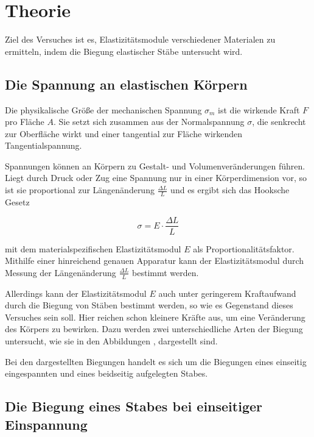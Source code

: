 \section{Theorie}
\label{sec:Theorie}

Ziel des Versuches ist es, Elastizitätsmodule verschiedener Materialen
zu ermitteln, indem die Biegung elastischer Stäbe untersucht wird.

\subsection{Die Spannung an elastischen Körpern}

Die physikalische Größe der mechanischen Spannung $\sigma_m$ ist die wirkende
Kraft $F$ pro Fläche $A$. Sie setzt sich zusammen aus der Normalspannung $\sigma$,
die senkrecht zur Oberfläche wirkt und einer tangential zur Fläche wirkenden
Tangentialspannung.

Spannungen können an Körpern zu Gestalt- und Volumenveränderungen
führen. Liegt durch Druck oder Zug eine Spannung nur in einer Körperdimension vor, 
so ist sie proportional zur Längenänderung $\frac{\Delta L}{L}$ und es ergibt sich
das Hooksche Gesetz

\begin{equation}
    \sigma = E \cdot \frac{\Delta L}{L}
\end{equation}

mit dem materialspezifischen Elastizitätsmodul $E$ als Proportionalitätsfaktor.
Mithilfe einer hinreichend genauen Apparatur kann der Elastizitätsmodul durch
Messung der Längenänderung $\frac{\Delta L}{L}$ bestimmt werden.

Allerdings kann der Elastizitätsmodul $E$ auch unter geringerem Kraftaufwand
durch die Biegung von Stäben bestimmt werden, so wie es Gegenstand dieses
Versuches sein soll. Hier reichen schon kleinere Kräfte aus, um eine Veränderung 
des Körpers zu bewirken. Dazu werden zwei unterschiedliche Arten der Biegung
untersucht, wie sie in den Abbildungen , dargestellt sind.

%

Bei den dargestellten Biegungen handelt es sich um die Biegungen eines einseitig
eingespannten und eines beidseitig aufgelegten Stabes.

\subsection{Die Biegung eines Stabes bei einseitiger Einspannung}

